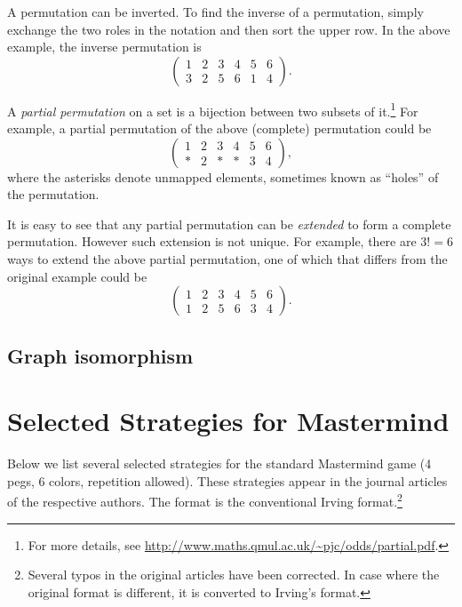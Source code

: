 A permutation can be inverted. To find the inverse of a permutation, simply exchange the two roles in the notation and then sort the upper row. In the above example, the inverse permutation is
\[
\begin{pmatrix}
1 & 2 & 3 & 4 & 5 & 6 \\
3 & 2 & 5 & 6 & 1 & 4
\end{pmatrix} .
\]


A \emph{partial permutation} on a set is a bijection between two subsets of it.\footnote{For more details, see \url{http://www.maths.qmul.ac.uk/~pjc/odds/partial.pdf}.}
For example, a partial permutation of the above (complete) permutation could be
\[
\begin{pmatrix}
1 & 2 & 3 & 4 & 5 & 6 \\
* & 2 & * & * & 3 & 4
\end{pmatrix} ,
\]
where the asterisks denote unmapped elements, sometimes known as ``holes'' of the permutation. 

It is easy to see that any partial permutation can be \emph{extended} to form a complete permutation. However such extension is not unique. For example, there are $3! = 6$ ways to extend the above partial permutation, one of which that differs from the original example could be
\[
\begin{pmatrix}
1 & 2 & 3 & 4 & 5 & 6 \\
1 & 2 & 5 & 6 & 3 & 4
\end{pmatrix} .
\]

\subsection{Graph isomorphism}

\section{Selected Strategies for Mastermind}

Below we list several selected strategies for the standard Mastermind game (4 pegs, 6 colors, repetition allowed). These strategies appear in the journal articles of the respective authors. The format is the conventional Irving format.\footnote{Several typos in the original articles have been corrected. In case where the original format is different, it is converted to Irving's format.}

